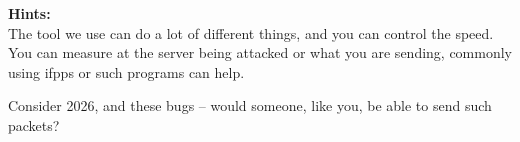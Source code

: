 \documentclass[a4paper,11pt,notitlepage]{report}
\begin{document}







%
%


{\bf Hints:}\\
The tool we use can do a lot of different things, and you can control the speed. You can measure at the server being attacked or what you are sending, commonly using ifpps or such programs can help.

Consider 2026, and these bugs -- would someone, like you, be able to send such packets?
\end{document}
